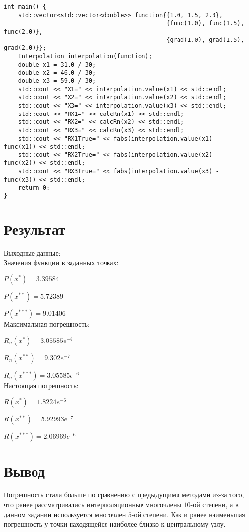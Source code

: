\documentclass[10pt]{scrartcl}
\begin{document}
\begin{verbatim}
int main() {
    std::vector<std::vector<double>> function{{1.0, 1.5, 2.0},
                                              {func(1.0), func(1.5), func(2.0)},
                                              {grad(1.0), grad(1.5), grad(2.0)}};
    Interpolation interpolation(function);
    double x1 = 31.0 / 30;
    double x2 = 46.0 / 30;
    double x3 = 59.0 / 30;
    std::cout << "X1=" << interpolation.value(x1) << std::endl;
    std::cout << "X2=" << interpolation.value(x2) << std::endl;
    std::cout << "X3=" << interpolation.value(x3) << std::endl;
    std::cout << "RX1=" << calcRn(x1) << std::endl;
    std::cout << "RX2=" << calcRn(x2) << std::endl;
    std::cout << "RX3=" << calcRn(x3) << std::endl;
    std::cout << "RX1True=" << fabs(interpolation.value(x1) - func(x1)) << std::endl;
    std::cout << "RX2True=" << fabs(interpolation.value(x2) - func(x2)) << std::endl;
    std::cout << "RX3True=" << fabs(interpolation.value(x3) - func(x3)) << std::endl;
    return 0;
}
\end{verbatim}
\section*{Результат}\noindent
Выходные данные:\\
Значения функции в заданных точках:

$P(x^*)=3.39584$

$P(x^{**})=5.72389$

$P(x^{***})=9.01406$\\
Максимальная погрешность:

$R_n(x^*)=3.05585e^{-6}$

$R_n(x^{**})=9.302e^{-7}$

$R_n(x^{***})=3.05585e^{-6}$\\
Настоящая погрешность:

$R(x^*)=1.8224e^{-6}$

$R(x^{**})=5.92993e^{-7}$

$R(x^{***})=2.06969e^{-6}$
\section*{Вывод}\noindent
Погрешность стала больше по сравнению с предыдущими методами из-за того, что ранее
рассматривались интерполяционные многочлены $10$-ой степени, а в данном задании 
используется многочлен $5$-ой степени. Как и ранее наименьшая погрешность у точки
находящейся наиболее близко к центральному узлу.
\end{document}
